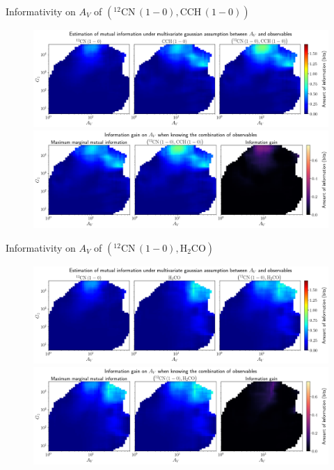 \documentclass{beamer}
\begin{document}
\begin{frame}{Informativity on $A_V$ of $\left(\mathrm{^{12}CN\,(1-0)},\mathrm{CCH\,(1-0)}\right)$}
    \begin{figure}
        \centering
        \includegraphics[width=0.95\linewidth]{../linearinfo/av__12cn10_cch10_linearinfo.png}
        \vfill
        \includegraphics[width=0.95\linewidth]{../linearinfo/av__12cn10_cch10_linearinfo_gain.png}
    \end{figure}
\end{frame}

\begin{frame}{Informativity on $A_V$ of $\left(\mathrm{^{12}CN\,(1-0)},\mathrm{H_2CO}\right)$}
    \begin{figure}
        \centering
        \includegraphics[width=0.95\linewidth]{../linearinfo/av__12cn10_h2co_linearinfo.png}
        \vfill
        \includegraphics[width=0.95\linewidth]{../linearinfo/av__12cn10_h2co_linearinfo_gain.png}
    \end{figure}
\end{frame}
\end{document}
